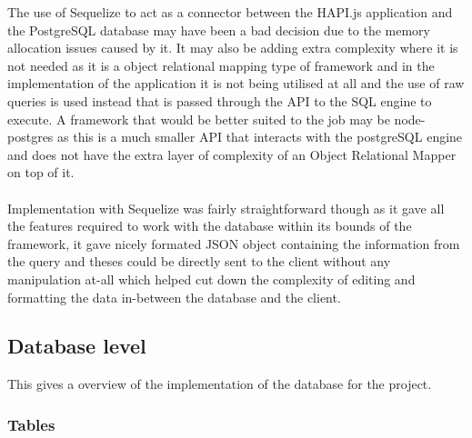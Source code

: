 The use of Sequelize \cite{SaschaDepold:Sequelize:2015:online} to act as a connector between the HAPI.js application and the PostgreSQL database may have been a bad decision due to the memory allocation issues caused by it. It may also be adding extra complexity where it is not needed as it is a object relational mapping type of framework and in the implementation of the application it is not being utilised at all and the use of raw queries is used instead that is passed through the API to the SQL engine to execute. A framework that would be better suited to the job may be node-postgres as this is a much smaller API that interacts with the postgreSQL engine and does not have the extra layer of complexity of an Object Relational Mapper on top of it.\\
\\
Implementation with Sequelize was fairly straightforward though as it gave all the features required to work with the database within its bounds of the framework, it gave nicely formated JSON object containing the information from the query and theses could be directly sent to the client without any manipulation at-all which helped cut down the complexity of editing and formatting the data in-between the database and the client.

\subsection{Database level}

This gives a overview of the implementation of the database for the project.

\subsubsection{Tables}

